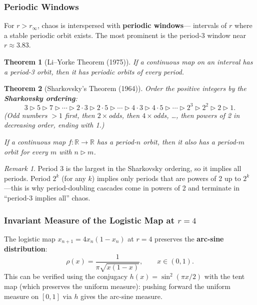 \documentclass[11pt,letterpaper]{article}
\theoremstyle{definition}
\theoremstyle{plain}
\newtheorem{theorem}{Theorem}[section]
\theoremstyle{remark}
\newtheorem{remark}{Remark}[section]
\begin{document}
\subsubsection{Periodic Windows}

For $r > r_\infty$, chaos is interspersed with \textbf{periodic windows}---
intervals of $r$ where a stable periodic orbit exists.  The most prominent
is the period-3 window near $r \approx 3.83$.

\begin{theorem}[Li--Yorke Theorem (1975)]
If a continuous map on an interval has a period-3 orbit, then it has
periodic orbits of \emph{every} period.
\end{theorem}

\begin{theorem}[Sharkovsky's Theorem (1964)]
Order the positive integers by the \textbf{Sharkovsky ordering}:
\[
  3 \rhd 5 \rhd 7 \rhd \cdots \rhd 2\cdot3 \rhd 2\cdot5 \rhd \cdots
  \rhd 4\cdot3 \rhd 4\cdot5 \rhd \cdots \rhd 2^3 \rhd 2^2 \rhd 2 \rhd 1.
\]
(Odd numbers $>1$ first, then $2\times$odds, then $4\times$odds, \ldots,
then powers of 2 in decreasing order, ending with 1.)

If a continuous map $f:\mathbb{R}\to\mathbb{R}$ has a period-$n$ orbit,
then it also has a period-$m$ orbit for every $m$ with $n\rhd m$.
\end{theorem}

\begin{remark}
Period 3 is the largest in the Sharkovsky ordering, so it implies all
periods.  Period $2^k$ (for any $k$) implies only periods that are
powers of 2 up to $2^k$---this is why period-doubling cascades come in
powers of 2 and terminate in ``period-3 implies all'' chaos.
\end{remark}

\subsubsection{Invariant Measure of the Logistic Map at $r=4$}

The logistic map $x_{n+1} = 4x_n(1-x_n)$ at $r=4$ preserves the
\textbf{arc-sine distribution}:
\begin{equation}
  \rho(x) = \frac{1}{\pi\sqrt{x(1-x)}}, \qquad x\in(0,1).
\end{equation}
This can be verified using the conjugacy $h(x) = \sin^2(\pi x/2)$ with
the tent map (which preserves the uniform measure): pushing forward the
uniform measure on $[0,1]$ via $h$ gives the arc-sine measure.
\end{document}
